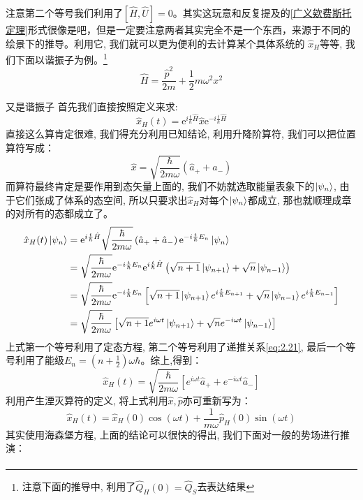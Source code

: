 \documentclass[a4paper,zihao=-4,linespread=1]{ctexrep}
\begin{document}
    注意第二个等号我们利用了$\left[\hat{H},\hat{U}\right]=0$。其实这玩意和反复提及的\ref{广义欸费斯托定理}形式很像是吧，但是一定要注意两者其实完全不是一个东西，来源于不同的绘景下的推导。利用它, 我们就可以更为便利的去计算某个具体系统的
    $\hat{x}_H$等等, 我们下面以谐振子为例。\footnote{注意下面的推导中, 利用了$\hat{Q}_H(0)=\hat{Q}_S$去表达结果}
    \[\hat{H}=\frac{\hat{p}^2}{2m}+\frac{1}{2}m\omega^2x^2\]
    \begin{example}{又是谐振子}
        首先我们直接按照定义来求:
        \[\hat{x}_H(t)=\mathrm e^{i\frac{t}{\hbar}\hat{H}}\hat{x}\mathrm e^{-i\frac{t}{\hbar}\hat{H}}\]
        直接这么算肯定很难, 我们得充分利用已知结论, 利用升降阶算符, 我们可以把位置算符写成：
        \[\hat{x}=\sqrt{\frac{\hbar}{2m\omega}}\left(\hat{a}_++\hat{a}_-\right)\]
        而算符最终肯定是要作用到态矢量上面的, 我们不妨就选取能量表象下的$\ket{\psi_n}$, 由于它们张成了体系的态空间, 所以只要求出$\hat{x}_H$对每个$\ket{\psi_n}$都成立, 那也就顺理成章的对所有的态都成立了。
        \begin{align*}
            \hat{x}_H(t)\ket{\psi_n}&=\mathrm e^{i\frac{t}{\hbar}\hat{H}}\sqrt{\frac{\hbar}{2m\omega}}\left(\hat{a}_++\hat{a}_-\right)\mathrm e^{-i\frac{t}{\hbar}E_n}\ket{\psi_n}\\
            &=\sqrt{\frac{\hbar}{2m\omega}}\mathrm e^{-i\frac{t}{\hbar}E_n}\mathrm e^{i\frac{t}{\hbar}\hat{H}}\left(\sqrt{n+1}\ket{\psi_{n+1}}+\sqrt{n}\ket{\psi_{n-1}}\right)\\
            &=\sqrt{\frac{\hbar}{2m\omega}}\mathrm e^{-i\frac{t}{\hbar}E_n}\left[\sqrt{n+1}\ket{\psi_{n+1}}e^{i\frac{t}{\hbar}E_{n+1}}+\sqrt{n}\ket{\psi_{n-1}}e^{i\frac{t}{\hbar}E_{n-1}}\right]\\
            &=\sqrt{\frac{\hbar}{2 m \omega}}\left[\sqrt{n+1} e^{i \omega t} \ket{\psi_{n+1}}+\sqrt{n} e^{-i \omega t} \ket{\psi_{n-1}}\right]
        \end{align*}
        上式第一个等号利用了定态方程, 第二个等号利用了递推关系\ref{eq:2.21}, 最后一个等号利用了能级$E_n=(n+\frac{1}{2})\omega\hbar$。综上,得到：
        \[\hat{x}_{H}(t)=\sqrt{\frac{\hbar}{2 m \omega}}\left[e^{i \omega t} \hat{a}_{+}+e^{-i \omega t} \hat{a}_{-}\right]\]
        利用产生湮灭算符的定义, 将上式利用$\hat{x},\hat{p}$亦可重新写为：
        \[\hat{x}_{H}(t)=\hat{x}_{H}(0) \cos (\omega t)+\frac{1}{m \omega} \hat{p}_{H}(0) \sin (\omega t)\]
        其实使用海森堡方程, 上面的结论可以很快的得出, 我们下面对一般的势场进行推演：
        \begin{equation}
            \begin{aligned}

\end{aligned}
\end{equation}
\end{example}
\end{document}
